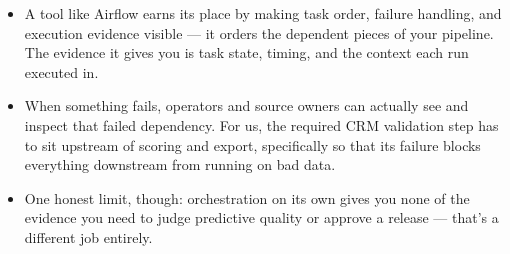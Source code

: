 \documentclass[11pt,a4paper]{article}
\begin{document}
\begin{examplebox}[title after break={SPOKEN SCRIPT --- slide 50 continued}]
\begin{itemize}
\item A tool like Airflow earns its place by making task order, failure handling, and execution evidence visible — it orders the dependent pieces of your pipeline. The evidence it gives you is task state, timing, and the context each run executed in.
\item When something fails, operators and source owners can actually see and inspect that failed dependency. For us, the required CRM validation step has to sit upstream of scoring and export, specifically so that its failure blocks everything downstream from running on bad data.
\item One honest limit, though: orchestration on its own gives you none of the evidence you need to judge predictive quality or approve a release — that's a different job entirely.
\end{itemize}
\end{examplebox}
\par\noindent{\scriptsize\textcolor{teal!60!black}{Reading anchor: Bass, Ch. 14 · Illustrative Airflow role}}
\clearpage
\end{document}
